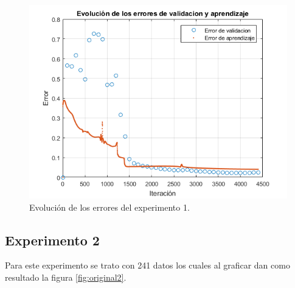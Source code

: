 \begin{figure}[H]
    \begin{center}
        \includegraphics[width=15cm]{1/error.png}
        \caption{Evolución de los errores del experimento 1.}
        \label{fig:error1}
    \end{center}
\end{figure}
\newpage

\subsection{Experimento 2}
Para este experimento se trato con 241 datos los cuales al graficar dan como resultado la figura \ref{fig:original2}.

